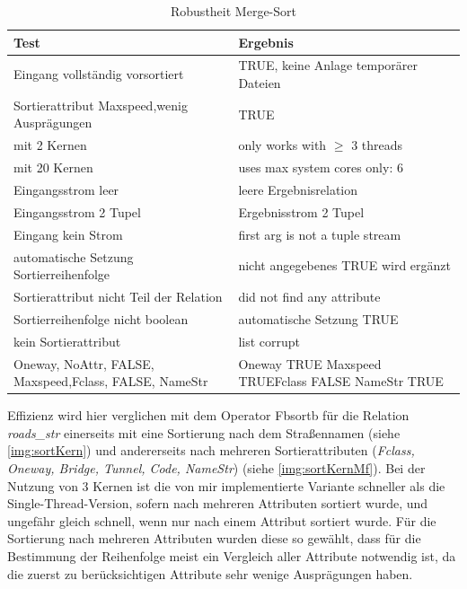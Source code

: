 \documentclass[a4paper,12pt,twoside]{article}
\newcommand{\Fb}[1]{\textit{#1}} %
\begin{document}
\begin{table}
	\centering
	\begin{tabular}{|p{7.5cm}|p{7.5cm}|}
		\hline 
		Test & Ergebnis \\
		\hline
		Eingang vollständig vorsortiert & TRUE, keine Anlage temporärer Dateien \\
		\hline
		Sortierattribut Maxspeed,\newline wenig Ausprägungen & TRUE  \\
		\hline
		mit 2 Kernen & only works with $\geq$ 3 threads  \\ 
		\hline
		mit 20 Kernen & uses max system cores only: 6 \\ 
		\hline
		Eingangsstrom leer & leere Ergebnisrelation \\ 
		\hline
		Eingangsstrom 2 Tupel & Ergebnisstrom 2 Tupel \\ 
		\hline
		Eingang kein Strom & first arg is not a tuple stream \\ 
		\hline
		automatische Setzung Sortierreihenfolge & nicht angegebenes TRUE wird ergänzt \\ 
		\hline
		Sortierattribut nicht Teil der Relation & did not find any attribute \\ 
		\hline
		Sortierreihenfolge nicht boolean & automatische Setzung TRUE \\ 
		\hline
		kein Sortierattribut & list corrupt \\
		\hline
		Oneway, NoAttr, FALSE, Maxspeed,\newline Fclass, FALSE, NameStr &  Oneway TRUE Maxspeed TRUE\newline Fclass FALSE NameStr TRUE \\
		\hline
\end{tabular}
	\caption{\label{tab:testSortRobust}Robustheit Merge-Sort}
\end{table}

Effizienz wird hier verglichen mit dem Operator Fb{sortb} für die Relation \Fb{roads\_str} einerseits mit eine Sortierung nach dem Straßennamen (siehe \autoref{img:sortKern}) und andererseits nach mehreren Sortierattributen (\Fb{Fclass, Oneway, Bridge, Tunnel, Code, NameStr}) (siehe \autoref{img:sortKernMf}). Bei der Nutzung von 3 Kernen ist die von mir implementierte Variante schneller als die Single-Thread-Version, sofern nach mehreren Attributen sortiert wurde, und ungefähr gleich schnell, wenn nur nach einem Attribut sortiert wurde. Für die Sortierung nach mehreren Attributen wurden diese so gewählt, dass für die Bestimmung der Reihenfolge meist ein Vergleich aller Attribute notwendig ist, da die zuerst zu berücksichtigen Attribute sehr wenige Ausprägungen haben.  
\end{document}
